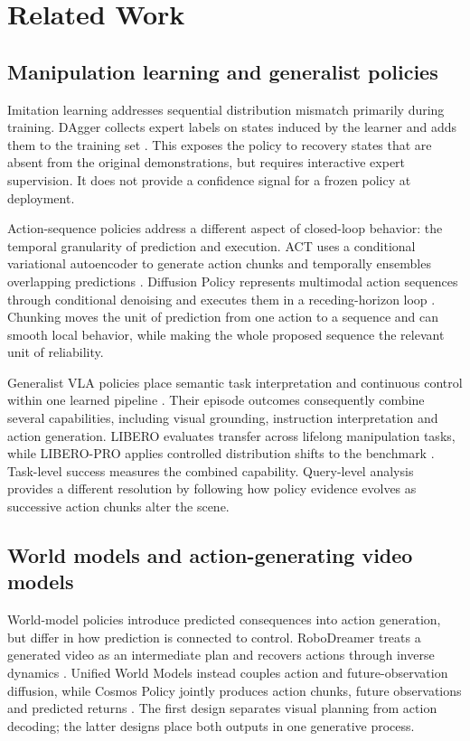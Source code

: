 \section{Related Work}
\label{sec:related-work}

\subsection{Manipulation learning and generalist policies}

Imitation learning addresses sequential distribution mismatch primarily during
training. DAgger collects expert labels on states induced by the learner and
adds them to the training set \cite{dagger}. This exposes the policy to recovery
states that are absent from the original demonstrations, but requires
interactive expert supervision. It does not provide a confidence signal for a
frozen policy at deployment.

Action-sequence policies address a different aspect of closed-loop behavior:
the temporal granularity of prediction and execution. ACT uses a conditional
variational autoencoder to generate action chunks and temporally ensembles
overlapping predictions \cite{act}. Diffusion Policy represents multimodal
action sequences through conditional denoising and executes them in a
receding-horizon loop \cite{diffusionpolicy}. Chunking moves the unit of
prediction from one action to a sequence and can smooth local behavior, while
making the whole proposed sequence the relevant unit of reliability.

Generalist VLA policies place semantic task interpretation and continuous
control within one learned pipeline \cite{kawaharazuka2025vla}. Their episode
outcomes consequently combine several capabilities, including visual
grounding, instruction interpretation and action generation. LIBERO evaluates
transfer across lifelong manipulation tasks, while LIBERO-PRO applies
controlled distribution shifts to the benchmark \cite{libero,liberopro}.
Task-level success measures the combined capability. Query-level analysis
provides a different resolution by following how policy evidence evolves as
successive action chunks alter the scene.

\subsection{World models and action-generating video models}

World-model policies introduce predicted consequences into action generation,
but differ in how prediction is connected to control. RoboDreamer treats a
generated video as an intermediate plan and recovers actions through inverse
dynamics \cite{robodreamer}. Unified World Models instead couples action and
future-observation diffusion, while Cosmos Policy jointly produces action
chunks, future observations and predicted returns
\cite{unifiedwm,cosmospolicy}. The first design separates visual planning from
action decoding; the latter designs place both outputs in one generative
process.

